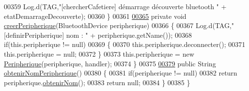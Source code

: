 \begin{DoxyCode}
00359         Log.d(TAG,\textcolor{stringliteral}{"[chercherCafetiere] démarrage découverte bluetooth "} + etatDemarrageDecouverte);
00360     \}
00361 
\hyperlink{classcom_1_1example_1_1ekawa_1_1_communication_a41f24da10de9e598f65941bf55320566}{00365}     \textcolor{keyword}{private} \textcolor{keywordtype}{void} \hyperlink{classcom_1_1example_1_1ekawa_1_1_communication_a41f24da10de9e598f65941bf55320566}{creerPeripherique}(BluetoothDevice peripherique)
00366     \{
00367         Log.d(TAG,\textcolor{stringliteral}{"[definirPeripherique] nom : "} + peripherique.getName());
00368         \textcolor{keywordflow}{if}(this.peripherique != null)
00369         \{
00370             this.peripherique.deconnecter();
00371             this.peripherique = null;
00372         \}
00373         this.peripherique = \textcolor{keyword}{new} \hyperlink{classcom_1_1example_1_1ekawa_1_1_peripherique}{Peripherique}(peripherique, handler);
00374     \}
00375 
\hyperlink{classcom_1_1example_1_1ekawa_1_1_communication_a133dd63afcf2d2f1229a416abe099494}{00379}     \textcolor{keyword}{public} String \hyperlink{classcom_1_1example_1_1ekawa_1_1_communication_a133dd63afcf2d2f1229a416abe099494}{obtenirNomPeripherique}()
00380     \{
00381         \textcolor{keywordflow}{if}(peripherique != null)
00382             \textcolor{keywordflow}{return} peripherique.\hyperlink{classcom_1_1example_1_1ekawa_1_1_peripherique_ad54cfafe03dfcf18cbd9b20602c4d86e}{obtenirNom}();
00383         \textcolor{keywordflow}{return} null;
00384     \}
00385 \}
\end{DoxyCode}
